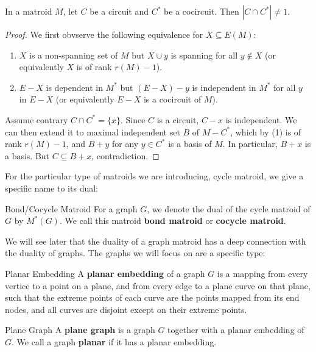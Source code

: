 \documentclass[a4paper,10pt]{article}
\renewcommand{\vocab}[1]{\textbf{#1}}
\begin{document}
\begin{proposition}{}
  In a matroid $M$, let $C$ be a circuit and $C^*$ be a cocircuit. Then $|C\cap C^*|\neq 1$.
  \begin{proof}
    We first obvserve the following equivalence for $X\subseteq E(M)$:
    \begin{enumerate}
      \item $X$ is a non-spanning set of $M$ but $X\cup y$ is spanning for all $y\notin X$ (or equivalently $X$ is of rank $r(M)-1$).
      \item $E-X$ is dependent in $M^*$ but $(E-X)-y$ is independent in $M^*$ for all $y$ in $E-X$ (or equivalently $E-X$ is a cocircuit of $M$).
    \end{enumerate}
    Assume contrary $C\cap C^*=\{x\}$. Since $C$ is a circuit, $C-x$ is independent. We can then extend it to maximal independent set $B$ of $M-C^*$, which by (1) is of rank $r(M)-1$, and $B+y$ for any $y\in C^*$ is a basis of $M$. In particular, $B+x$ is a basis. But $C\subseteq B+x$, contradiction.
  \end{proof}
\end{proposition}

For the particular type of matroids we are introducing, cycle matroid, we give a specific name to its dual:

\begin{definition}[def:]{Bond/Cocycle Matroid}
  For a graph $G$, we denote the dual of the cycle matroid of $G$ by $M^*(G)$. We call this matroid \vocab{bond matroid} or \vocab{cocycle matroid}.
\end{definition}

We will see later that the duality of a graph matroid has a deep connection with the duality of graphs. The graphs we will focus on are a specific type:

\begin{definition}[def:]{Planar Embedding}
  A \vocab{planar embedding} of a graph $G$ is a mapping from every vertice to a point on a plane, and from every edge to a plane curve on that plane, such that the extreme points of each curve are the points mapped from its end nodes, and all curves are disjoint except on their extreme points. 
\end{definition}

\begin{definition}[def:]{Plane Graph}
  A \vocab{plane graph} is a graph $G$ together with a planar embedding of $G$. We call a graph \textbf{planar} if it has a planar embedding.
\end{definition}
\end{document}
